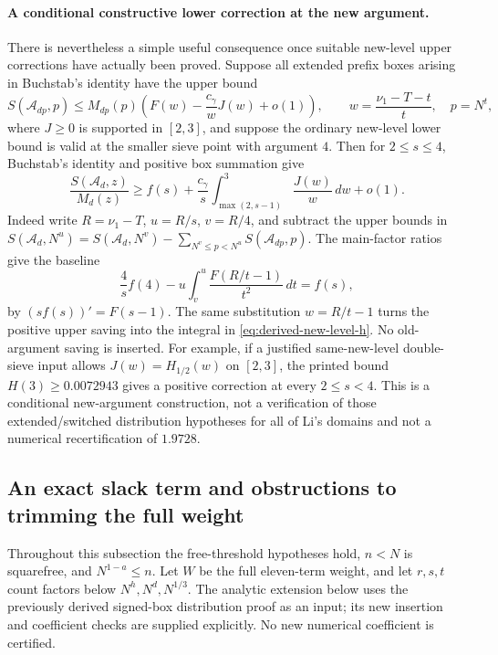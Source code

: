 \documentclass[11pt]{article}
\begin{document}
\paragraph{A conditional constructive lower correction at the new argument.}
There is nevertheless a simple useful consequence once suitable
new-level upper corrections have actually been proved. Suppose all
extended prefix boxes arising in Buchstab's identity have the upper
bound
\[
 S(\mathcal A_{dp},p)\le
 M_{dp}(p)\left(F(w)-\frac{c_\gamma}{w}J(w)+o(1)\right),
 \qquad w=\frac{\nu_1-T-t}{t},\quad p=N^t,
\]
where $J\ge0$ is supported in $[2,3]$, and suppose the ordinary
new-level lower bound is valid at the smaller sieve point with
argument $4$. Then for $2\le s\le4$, Buchstab's identity and positive
box summation give
\begin{equation}\label{eq:derived-new-level-h}
 \frac{S(\mathcal A_d,z)}{M_d(z)}\ge
 f(s)+\frac{c_\gamma}{s}
       \int_{\max(2,s-1)}^3\frac{J(w)}w\,dw+o(1).
\end{equation}
Indeed write $R=\nu_1-T$, $u=R/s$, $v=R/4$, and subtract the
upper bounds in
$S(\mathcal A_d,N^u)=S(\mathcal A_d,N^v)
-\sum_{N^v\le p<N^u}S(\mathcal A_{dp},p)$.
The main-factor ratios give the baseline
\[
 \frac4s f(4)-u\int_v^u\frac{F(R/t-1)}{t^2}\,dt=f(s),
\]
by $(sf(s))'=F(s-1)$. The same substitution $w=R/t-1$ turns the
positive upper saving into the integral in
\eqref{eq:derived-new-level-h}. No old-argument saving is inserted.
For example, if a justified same-new-level double-sieve input allows
$J(w)=H_{1/2}(w)$ on $[2,3]$, the printed bound $H(3)\ge0.0072943$
gives a positive correction at every $2\le s<4$.
This is a conditional new-argument construction, not a verification
of those extended/switched distribution hypotheses for all of Li's
domains and not a numerical recertification of $1.9728$.

\subsection{An exact slack term and obstructions to trimming the full weight}
\label{sec:richer-weight-route}

Throughout this subsection the free-threshold hypotheses hold, $n<N$
is squarefree, and $N^{1-a}\le n$.  Let $W$ be the full eleven-term
weight, and let $r,s,t$ count factors below $N^h,N^d,N^{1/3}$.
The analytic extension below uses the previously derived signed-box
distribution proof as an input; its new insertion and coefficient checks
are supplied explicitly.  No new numerical coefficient is certified.
\end{document}
